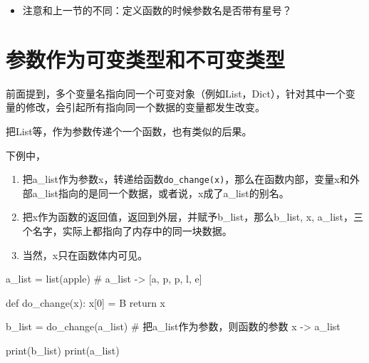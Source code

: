 \documentclass[
  letterpaper,
  DIV=11,
  numbers=noendperiod]{scrreprt}
\newenvironment{Shaded}{\begin{snugshade}}{\end{snugshade}}
\newcommand{\BuiltInTok}[1]{\textcolor[rgb]{0.00,0.23,0.31}{#1}}
\newcommand{\CommentTok}[1]{\textcolor[rgb]{0.37,0.37,0.37}{#1}}
\newcommand{\ControlFlowTok}[1]{\textcolor[rgb]{0.00,0.23,0.31}{#1}}
\newcommand{\DecValTok}[1]{\textcolor[rgb]{0.68,0.00,0.00}{#1}}
\newcommand{\KeywordTok}[1]{\textcolor[rgb]{0.00,0.23,0.31}{#1}}
\newcommand{\NormalTok}[1]{\textcolor[rgb]{0.00,0.23,0.31}{#1}}
\newcommand{\OperatorTok}[1]{\textcolor[rgb]{0.37,0.37,0.37}{#1}}
\newcommand{\StringTok}[1]{\textcolor[rgb]{0.13,0.47,0.30}{#1}}
\providecommand{\tightlist}{%
  \setlength{\itemsep}{0pt}\setlength{\parskip}{0pt}}\usepackage{longtable,booktabs,array}
\begin{document}
\begin{itemize}
\tightlist
\item
  注意和上一节的不同：定义函数的时候参数名是否带有星号？
\end{itemize}

\hypertarget{ux53c2ux6570ux4f5cux4e3aux53efux53d8ux7c7bux578bux548cux4e0dux53efux53d8ux7c7bux578b}{%
\section{参数作为可变类型和不可变类型}\label{ux53c2ux6570ux4f5cux4e3aux53efux53d8ux7c7bux578bux548cux4e0dux53efux53d8ux7c7bux578b}}

前面提到，多个变量名指向同一个可变对象（例如List，Dict），针对其中一个变量的修改，会引起所有指向同一个数据的变量都发生改变。

把List等，作为参数传递个一个函数，也有类似的后果。

下例中，

\begin{enumerate}
\def\labelenumi{\arabic{enumi}.}
\tightlist
\item
  把a\_list作为参数x，转递给函数\texttt{do\_change(x)}，那么在函数内部，变量x和外部a\_list指向的是同一个数据，或者说，x成了a\_list的别名。
\item
  把x作为函数的返回值，返回到外层，并赋予b\_list，那么b\_list, x,
  a\_list，三个名字，实际上都指向了内存中的同一块数据。
\item
  当然，x只在函数体内可见。
\end{enumerate}

\begin{Shaded}
\begin{Highlighting}[]
\NormalTok{a\_list }\OperatorTok{=} \BuiltInTok{list}\NormalTok{(}\StringTok{\textquotesingle{}apple\textquotesingle{}}\NormalTok{) }\CommentTok{\# a\_list {-}\textgreater{} [\textquotesingle{}a\textquotesingle{}, \textquotesingle{}p\textquotesingle{}, \textquotesingle{}p\textquotesingle{}, \textquotesingle{}l\textquotesingle{}, \textquotesingle{}e\textquotesingle{}]}

\KeywordTok{def}\NormalTok{ do\_change(x):}
\NormalTok{    x[}\DecValTok{0}\NormalTok{] }\OperatorTok{=} \StringTok{\textquotesingle{}B\textquotesingle{}}
    \ControlFlowTok{return}\NormalTok{ x}

\NormalTok{b\_list }\OperatorTok{=}\NormalTok{ do\_change(a\_list) }\CommentTok{\# 把a\_list作为参数，则函数的参数 x {-}\textgreater{} a\_list }

\BuiltInTok{print}\NormalTok{(b\_list)}
\BuiltInTok{print}\NormalTok{(a\_list)}
\end{Highlighting}
\end{Shaded}
\end{document}
